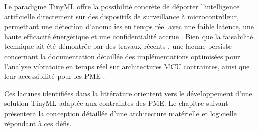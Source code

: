 Le paradigme TinyML offre la possibilité concrète de déporter l'intelligence artificielle directement sur des dispositifs de surveillance à microcontrôleur, permettant une détection d'anomalies en temps réel avec une faible latence, une haute efficacité énergétique et une confidentialité accrue \cite{tsoukas2024,njor2024}. Bien que la faisabilité technique ait été démontrée par des travaux récents \cite{arciniegas2025,antonini2023,langer2025}, une lacune persiste concernant la documentation détaillée des implémentations optimisées pour l'analyse vibratoire en temps réel sur architectures MCU contraintes, ainsi que leur accessibilité pour les PME \cite{oecd2021}.

Ces lacunes identifiées dans la littérature orientent vers le développement d'une solution TinyML adaptée aux contraintes des PME. Le chapitre suivant présentera la conception détaillée d'une architecture matérielle et logicielle répondant à ces défis.